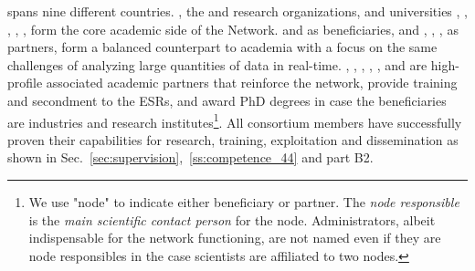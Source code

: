 

\acronym spans nine different countries. 
\cernentity, the \nikhefentity and \cnrsentity research organizations, and universities \sorbonneentity, \helsinkientity, \unigeentity, \dortmundentity, \lundentity, \heidelbergentity form the core academic side of the Network.
\ibmentity and \fleetmaticsentity as beneficiaries, and \ximantisentity, \lightboxentity, \fleetmaticsentity, as partners, form a balanced counterpart to academia with a focus on the same challenges of analyzing large quantities of data in real-time. 
\oregonentity, \ohioentity, \cincinnatientity, \pisaentity, \santiagoentity, \radboudentity and \amsterdamentity are high-profile associated academic partners that reinforce the
network, provide training and secondment to the ESRs, and award PhD degrees in case the beneficiaries are industries and research institutes\footnote{We use "node" to indicate
either beneficiary or partner. The \textit{node responsible} is the \textit{main scientific contact person} for the node. Administrators, albeit indispensable for the network functioning, are not named even if they are node responsibles in the case scientists are affiliated to two nodes.}.
All consortium members have successfully proven their capabilities for research, training, exploitation and dissemination as shown in Sec.~\ref{sec:supervision},~\ref{ss:competence_44} and part B2.

